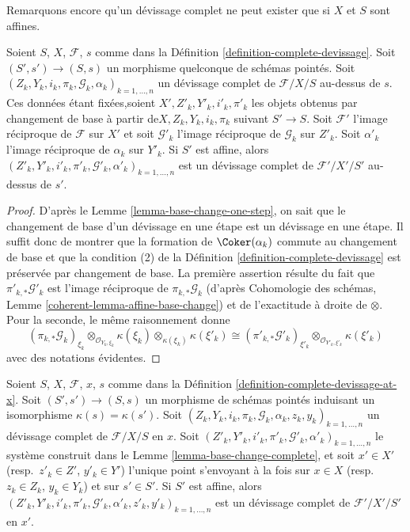 \noindent
Remarquons encore qu'un d\'evissage complet ne peut exister que si $X$ et
$S$ sont affines.

\begin{lemma}
\label{lemma-base-change-complete}
Soient $S$, $X$, $\mathcal{F}$, $s$ comme dans la
Définition \ref{definition-complete-devissage}.
Soit $(S', s') \to (S, s)$ un morphisme quelconque de schémas pointés.
Soit $(Z_k, Y_k, i_k, \pi_k, \mathcal{G}_k, \alpha_k)_{k = 1, \ldots, n}$
un d\'evissage complet de $\mathcal{F}/X/S$ au-dessus de $s$.
Ces données étant fixées,\newline soient $X', Z'_k, Y'_k, i'_k, \pi'_k$ les objets obtenus par changement
de base à partir de\newline $X, Z_k, Y_k, i_k, \pi_k$ suivant $S' \to S$.
Soit $\mathcal{F}'$ l'image réciproque de $\mathcal{F}$ sur $X'$
et soit $\mathcal{G}'_k$ l'image réciproque de $\mathcal{G}_k$ sur $Z'_k$.
Soit $\alpha'_k$ l'image réciproque de $\alpha_k$ sur $Y'_k$.
Si $S'$ est affine, alors
$(Z'_k, Y'_k, i'_k, \pi'_k, \mathcal{G}'_k, \alpha'_k)_{k = 1, \ldots, n}$
est un d\'evissage complet de $\mathcal{F}'/X'/S'$ au-dessus de $s'$.
\end{lemma}

\begin{proof}
D'après le
Lemme \ref{lemma-base-change-one-step},
on sait que le changement de base d'un d\'evissage en une étape est un
d\'evissage en une étape. Il suffit donc de montrer que la formation de
$\Coker(\alpha_k)$ commute au changement de base et que la
condition (2) de la
Définition \ref{definition-complete-devissage}
est préservée par changement de base. La première assertion résulte du fait que
$\pi'_{k, *}\mathcal{G}'_k$ est l'image réciproque de
$\pi_{k, *}\mathcal{G}_k$ (d'après
Cohomologie des schémas, Lemme \ref{coherent-lemma-affine-base-change})
et de l'exactitude à droite de $\otimes$. Pour la seconde,
le même raisonnement donne
$$
(\pi_{k, *}\mathcal{G}_k)_{\xi_k}
\otimes_{\mathcal{O}_{Y_k, \xi_k}} \kappa(\xi_k)
\otimes_{\kappa(\xi_k)} \kappa(\xi'_k)
\cong
(\pi'_{k, *}\mathcal{G}'_k)_{\xi'_k}
\otimes_{\mathcal{O}_{Y'_k, \xi'_k}} \kappa(\xi'_k)
$$
avec des notations évidentes.
\end{proof}

\begin{lemma}
\label{lemma-base-change-complete-at-x}
Soient $S$, $X$, $\mathcal{F}$, $x$, $s$ comme dans la
Définition \ref{definition-complete-devissage-at-x}.
Soit $(S', s') \to (S, s)$ un morphisme de schémas pointés
induisant un isomorphisme $\kappa(s) = \kappa(s')$. Soit
$(Z_k, Y_k, i_k, \pi_k, \mathcal{G}_k, \alpha_k, z_k, y_k)_{k = 1, \ldots, n}$
un d\'evissage complet de $\mathcal{F}/X/S$ en $x$.
Soit
$(Z'_k, Y'_k, i'_k, \pi'_k, \mathcal{G}'_k, \alpha'_k)_{k = 1, \ldots, n}$
le système construit dans le
Lemme \ref{lemma-base-change-complete},
et soit $x' \in X'$ (resp.\ $z'_k \in Z'$, $y'_k \in Y'$) l'unique
point s'envoyant à la fois sur $x \in X$ (resp.\ $z_k \in Z_k$, $y_k \in Y_k$)
et sur $s' \in S'$.\newline
Si $S'$ est affine, alors
$(Z'_k, Y'_k, i'_k, \pi'_k, \mathcal{G}'_k, \alpha'_k,
z'_k, y'_k)_{k = 1, \ldots, n}$
est un d\'evissage complet de $\mathcal{F}'/X'/S'$ en $x'$.
\end{lemma}

